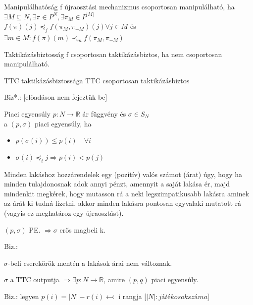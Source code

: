 	\begin{definition}{Manipulálhatóság}{}
		f újraosztási mechanizmus csoportosan manipulálható, ha $\exists M \subseteq N, \exists \pi \in P^N, \exists \pi_M \in P^{|M|} $\\
		$f(\pi)(j) \preceq_j f(\pi_M , \pi_{-M})(j) \forall j \in M$ és $\exists m \in M : f(\pi)(m)\prec_m f(\pi_M, \pi_{-M})$
	\end{definition}
	
	\begin{definition}{Taktikázásbiztosság}{}
		f csoportosan taktikázásbiztos, ha nem csoportosan manipulálható.
	\end{definition}
	
	\begin{theorem}{TTC taktikázásbiztossága}{}
		TTC csoportosan taktikázásbiztos
	\end{theorem}
	Biz*.: [előadáson nem fejeztük be]
	
	\begin{definition}{Piaci egyensúly}{}
		$p: N \rightarrow \mathbb{R}$ ár függvény és $\sigma \in S_N$ \\
		a $(p, \sigma)$ piaci egyensúly, ha
		\begin{itemize}
			\item $p (\sigma(i)) \leq p(i) \quad \forall i$
			\item $\sigma(i) \preceq_i j \Rightarrow p(i) < p(j)$
		\end{itemize}
		Minden lakáshoz hozzárendelek egy (pozitív) valós számot (árat) úgy, hogy
		ha minden tulajdonosnak adok annyi pénzt, amennyit a saját lakása ér, majd mindenkit megkérek, hogy mutasson rá a neki legszimpatikusabb lakásra aminek az árát ki tudná fizetni, akkor minden lakásra pontosan egyvalaki mutatott rá (vagyis ez meghatároz egy újraosztást).
	\end{definition}
	
	\begin{statement}{}{}
		$(p, \sigma)$ PE. $\Rightarrow \sigma$ erős magbeli k.
	\end{statement}
	Biz.:
	
	\begin{observation}{}{}
		$\sigma$-beli cserekörök mentén a lakások árai nem változnak.
	\end{observation}
	
	\begin{statement}{}{}
		$\sigma$ a TTC outputja $\Rightarrow \exists p : N \rightarrow \mathbb{R}$, amire $(p, q)$ piaci egyensúly.
	\end{statement}
	Biz.: legyen $p(i) = |N|-r(i) \leftarrowtail$ i rangja [$|N|: játékosok száma$]
	
